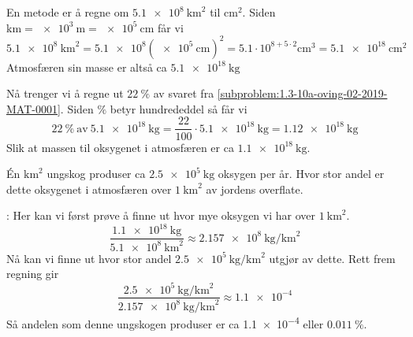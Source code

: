 \documentclass[a4paper,11pt]{article}
\begin{document}
\begin{solution}
   En metode er å regne om
  $\SI{5.1e8}{\km\squared}$ til $\si{\cm\squared}$. Siden
  $\si{\km}=\SI{e3}{\m}=\SI{e5}{\cm}$ får vi
  \begin{equation*}
    \SI{5.1e8}{\km\squared}
    = \num{5.1e8}(\SI{e5}{\cm})^2
    = \num{5.1}\cdot10^{8+5\cdot2}\si{\cm\cubed}
    = \SI{5.1e18}{\cm\squared}
  \end{equation*}
  Atmosfæren sin masse er altså ca $\SI{5.1e18}{\kg}$
  \medskip
\end{solution}

\begin{solution}
   Nå trenger vi å regne ut
  $\SI{22}{\percent}$ av svaret fra
  \cref{subproblem:1.3-10a-oving-02-2019-MAT-0001}. Siden $\si{\percent}$ betyr
  hundrededdel så får vi
  \begin{equation*}
    \SI{22}{\percent} \ \text{av} \ \SI{5.1e18}{\kg}
    = \frac{22}{100} \cdot \SI{5.1e18}{\kg}
    = \SI{1.12e18}{\kg}
  \end{equation*}
  Slik at massen til oksygenet i atmosfæren er ca $\SI{1.1e18}{\kg}$.
\end{solution}


\begin{problem}
  \label{problem:1.3-11-oving-02-2019-MAT-0001} Én $\si{\km\squared}$ ungskog
  produser ca $\SI{2.5e5}{\kg}$ oksygen per år. Hvor stor andel er dette
  oksygenet i atmosfæren over $\SI{1}{\km\squared}$ av jordens overflate.
\end{problem}

\begin{solution}
  : Her kan vi først prøve å finne ut
  hvor mye oksygen vi har over $\SI{1}{\km\squared}$.
  \begin{equation*}
    \frac{\SI{1.1e18}{\kg}}{\SI{5.1e8}{\km\squared}} 
    \approx \SI{2.157e8}{\kg \per \km\squared}
  \end{equation*}
  Nå kan vi finne ut hvor stor andel $\SI{2.5e5}{\kg\per\km\squared}$
  utgjør av dette. Rett frem regning gir
  \begin{equation*}
    \frac{\SI{2.5e5}{\kg\per\km\squared}}{\SI{2.157e8}{\kg \per \km\squared}} 
    \approx \num{1.1e-4}
  \end{equation*}
  Så andelen som denne ungskogen produser er ca \num{1.1e-4} eller
  $\SI{0.011}{\percent}$.
\end{solution}
\end{document}
